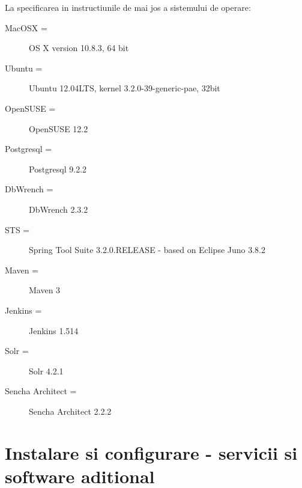 La specificarea in instructiunile de mai jos a sistemului de operare:
\begin{description} 
\item [MacOSX =] OS X version 10.8.3, 64 bit
\item [Ubuntu =] Ubuntu 12.04LTS, kernel 3.2.0-39-generic-pae, 32bit
\item [OpenSUSE = ] OpenSUSE 12.2
\item [Postgresql =] Postgresql 9.2.2
\item [DbWrench =] DbWrench 2.3.2
\item [STS =] Spring Tool Suite 3.2.0.RELEASE - based on Eclipse Juno 3.8.2
\item [Maven =] Maven 3
\item [Jenkins =] Jenkins 1.514
\item [Solr =] Solr 4.2.1
\item [Sencha Architect =] Sencha Architect 2.2.2
\end{description}

\section{Instalare si configurare - servicii si software aditional}

